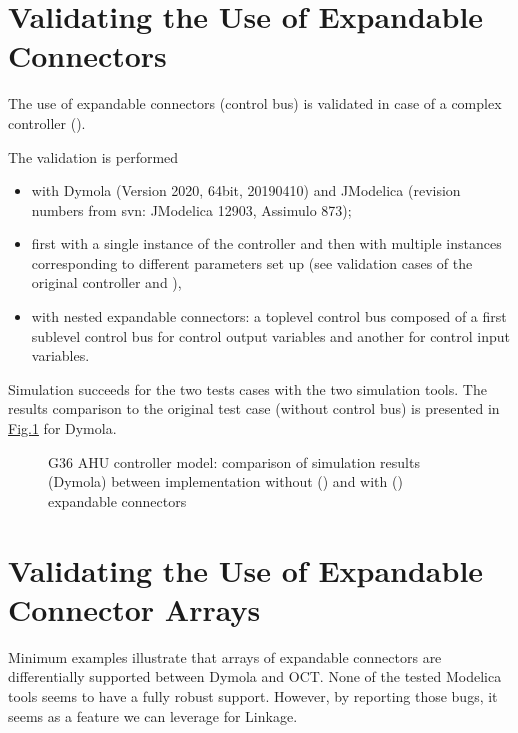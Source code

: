 \documentclass[letterpaper,10pt, openany,english]{sphinxmanual}
\let\sphinxpxdimen\pdfpxdimen\else\newdimen\sphinxpxdimen
\begin{document}
\section{Validating the Use of Expandable Connectors}
\label{\detokenize{annex:validating-the-use-of-expandable-connectors}}\label{\detokenize{annex:sec-annex-bus-valid}}
The use of expandable connectors (control bus) is validated in case of a complex controller ().

The validation is performed
\begin{itemize}
\item {} 
with Dymola (Version 2020, 64\sphinxhyphen{}bit, 2019\sphinxhyphen{}04\sphinxhyphen{}10) and JModelica (revision numbers from svn: JModelica 12903, Assimulo 873);

\item {} 
first with a single instance of the controller and then with multiple instances corresponding to different parameters set up (see validation cases of the original controller  and ),

\item {} 
with nested expandable connectors: a top\sphinxhyphen{}level control bus composed of a first sub\sphinxhyphen{}level control bus for control output variables and another for control input variables.

\end{itemize}

Simulation succeeds for the two tests cases with the two simulation tools.
The results comparison to the original test case (without control bus) is presented in \hyperref[\detokenize{annex:annex-valid-bus}]{Fig.\@ \ref{\detokenize{annex:annex-valid-bus}}} for Dymola.

\begin{figure}[htbp]
\centering
\capstart

\noindent\sphinxincludegraphics[width=800\sphinxpxdimen]{{annex_valid_bus}.pdf}
\caption{G36 AHU controller model: comparison of simulation results (Dymola) between implementation without () and with () expandable connectors}\label{\detokenize{annex:annex-valid-bus}}\end{figure}


\section{Validating the Use of Expandable Connector Arrays}
\label{\detokenize{annex:validating-the-use-of-expandable-connector-arrays}}\label{\detokenize{annex:sec-annex-bus-array}}
Minimum examples illustrate that arrays of expandable connectors are differentially supported between Dymola and OCT. None of the tested Modelica tools seems to have a fully robust support. However, by reporting those bugs, it seems as a feature we can leverage for Linkage.
\end{document}
